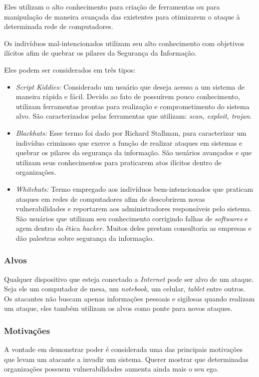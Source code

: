 Eles utilizam o alto conhecimento para criação de ferramentas ou para manipulação de maneira avançada das existentes para otimizarem o ataque à determinada rede de computadores. 

Os indivíduos mal-intencionados utilizam seu alto conhecimento com objetivos ilícitos afim de quebrar os pilares da Segurança da Informação.

Eles podem ser considerados em três tipos:

\begin{itemize}
\item \textit{Script Kiddies:} Considerado um usuário que deseja acesso a um sistema de maneira rápida e fácil. Devido ao fato de possuírem pouco conhecimento, utilizam ferramentas prontas para realização e comprometimento do sistema alvo. São caracterizados pelas ferramentas que utilizam: \textit{scan, exploit, trojan}.

\item \textit{Blackhats:} Esse termo foi dado por Richard Stallman, para caracterizar um indivíduo criminoso que exerce a função de realizar ataques em sistemas e quebrar os pilares da segurança da informação. São usuários avançados e que utilizam seus conhecimentos para praticarem atos ilícitos dentro de organizações.

\item \textit{Whitehats:} Termo empregado aos indivíduos bem-intencionados que praticam ataques em redes de computadores afim de descobrirem novas vulnerabilidades e reportarem aos administradores responsáveis pelo sistema. São usuários que utilizam seu conhecimento corrigindo falhas de \textit{softwares} e agem dentro da ética \textit{hacker}. Muitos deles prestam consultoria as empresas e dão palestras sobre segurança da informação.
\end{itemize}

\subsubsection{Alvos}
Qualquer dispositivo que esteja conectado a \textit{Internet} pode ser alvo de um ataque. Seja ele um computador de mesa, um \textit{notebook}, um celular, \textit{tablet} entre outros. Os atacantes não buscam apenas informações pessoais e sigilosas quando realizam um ataque, eles também utilizam os alvos como ponte para novos ataques.

\subsubsection{Motivações}
A vontade em demonstrar poder é considerada uma das principais motivações que levam um atacante a invadir um sistema. Querer mostrar que determinadas organizações possuem vulnerabilidades aumenta ainda mais o seu ego.

